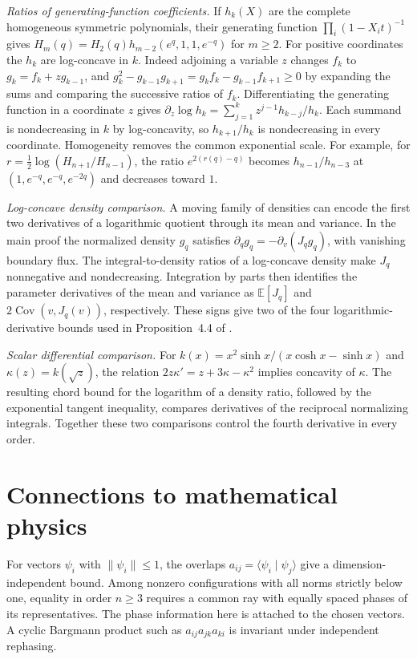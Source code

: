 \documentclass[10pt,twoside,reqno]{amsart}
\numberwithin{equation}{section}
\begin{document}
\medskip
\noindent
\textit{Ratios of generating-function coefficients.}
If \(h_k(X)\) are the complete homogeneous symmetric polynomials, their
generating function \(\prod_i(1-X_i t)^{-1}\) gives
\(H_m(q)=H_2(q)h_{m-2}(e^q,1,1,e^{-q})\) for \(m\ge2\).
For positive coordinates the \(h_k\) are log-concave in \(k\).
Indeed adjoining a variable \(z\) changes \(f_k\) to \(g_k=f_k+zg_{k-1}\),
and \(g_k^2-g_{k-1}g_{k+1}=g_k f_k-g_{k-1}f_{k+1}\ge0\) by expanding the
sums and comparing the successive ratios of \(f_k\).
Differentiating the generating function in a coordinate \(z\) gives
\(\partial_z\log h_k=\sum_{j=1}^k z^{j-1}h_{k-j}/h_k\).
Each summand is nondecreasing in \(k\) by log-concavity, so
\(h_{k+1}/h_k\) is nondecreasing in every coordinate.
Homogeneity removes the common exponential scale. For example, for
\(r=\tfrac12\log(H_{n+1}/H_{n-1})\), the ratio \(e^{2(r(q)-q)}\) becomes
\(h_{n-1}/h_{n-3}\) at \((1,e^{-q},e^{-q},e^{-2q})\) and decreases toward \(1\).

\medskip
\noindent
\textit{Log-concave density comparison.}
A moving family of densities can encode the first two derivatives of a
logarithmic quotient through its mean and variance. In the main proof
the normalized density \(g_q\) satisfies
\(\partial_q g_q=-\partial_v(J_q g_q)\), with vanishing boundary flux.
The integral-to-density ratios of a log-concave density make \(J_q\)
nonnegative and nondecreasing. Integration by parts then identifies
the parameter derivatives of the mean and variance as
\(\mathbb E[J_q]\) and \(2\operatorname{Cov}(v,J_q(v))\), respectively.
These signs give two of the four logarithmic-derivative bounds used in
Proposition~4.4 of \cite{main}.

\medskip
\noindent
\textit{Scalar differential comparison.}
For \(k(x)=x^2\sinh x/(x\cosh x-\sinh x)\) and
\(\kappa(z)=k(\sqrt z)\), the relation
\(2z\kappa'=z+3\kappa-\kappa^2\) implies concavity of \(\kappa\).
The resulting chord bound for the logarithm of a density ratio,
followed by the exponential tangent inequality, compares derivatives
of the reciprocal normalizing integrals. Together these two
comparisons control the fourth derivative in every order.

\section{Connections to mathematical physics}

For vectors \(\psi_i\) with \(\|\psi_i\|\le1\), the overlaps
\(a_{ij}=\langle\psi_i\mid\psi_j\rangle\) give a dimension-independent
bound. Among nonzero configurations with all norms strictly below one,
equality in order \(n\ge3\) requires a common ray with equally spaced
phases of its representatives. The phase information here is attached
to the chosen vectors. A cyclic Bargmann product such as
\(a_{ij}a_{jk}a_{ki}\) is invariant under independent rephasing.
\end{document}
